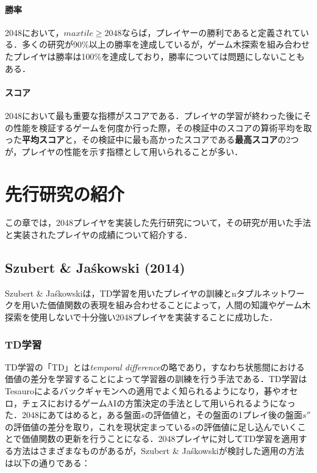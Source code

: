 \documentclass{suribt}
\begin{document}
\subsubsection{勝率}
2048において，$max tile \geq 2048$ならば，プレイヤーの勝利であると定義されている．多くの研究が90\%以上の勝率を達成しているが，ゲーム木探索を組み合わせたプレイヤは勝率は100\%を達成しており，勝率については問題にしないこともある．

\subsubsection{スコア}
2048において最も重要な指標がスコアである．プレイヤの学習が終わった後にその性能を検証するゲームを何度か行った際，その検証中のスコアの算術平均を取った\textbf{平均スコア}と，その検証中に最も高かったスコアである\textbf{最高スコア}の2つが，プレイヤの性能を示す指標として用いられることが多い．

\chapter{先行研究の紹介}
この章では，2048プレイヤを実装した先行研究について，その研究が用いた手法と実装されたプレイヤの成績について紹介する．

\section{Szubert \& Ja\'{s}kowski (2014)}
Szubert \& Ja\'{s}kowskiは，TD学習を用いたプレイヤの訓練とnタプルネットワークを用いた価値関数の表現を組み合わせることによって，人間の知識やゲーム木探索を使用しないで十分強い2048プレイヤを実装することに成功した．
\subsection{TD学習}
TD学習の「TD」とは\emph{temporal difference}の略であり，すなわち状態間における価値の差分を学習することによって学習器の訓練を行う手法である．TD学習はTesauroによるバックギャモンへの適用\cite{Tesauro}でよく知られるようになり，碁\cite{Runarsson}\cite{Schraudolph}やオセロ\cite{Dries}\cite{SzubertOthello}，チェス\cite{Baxter}におけるゲームAIの方策決定の手法として用いられるようになった．2048にあてはめると，ある盤面$s$の評価値と，その盤面の1プレイ後の盤面$s''$の評価値の差分を取り，これを現状定まっている$s$の評価値に足し込んでいくことで価値関数の更新を行うことになる．2048プレイヤに対してTD学習を適用する方法はさまざまなものがあるが，Szubert \& Ja\'{s}kowskiが検討した適用の方法は以下の通りである：
\end{document}
